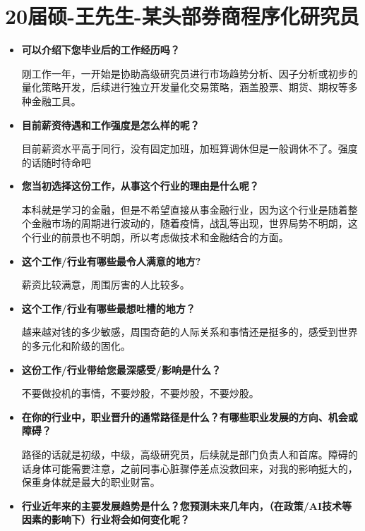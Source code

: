 \newpage
\section{20届硕-王先生-某头部券商程序化研究员}
\begin{itemize}

\setlength{\parindent}{2em} 
    \item \textbf{可以介绍下您毕业后的工作经历吗？}

刚工作一年，一开始是协助高级研究员进行市场趋势分析、因子分析或初步的量化策略开发，后续进行独立开发量化交易策略，涵盖股票、期货、期权等多种金融工具。

    \item \textbf{目前薪资待遇和工作强度是怎么样的呢？}

目前薪资水平高于同行，没有固定加班，加班算调休但是一般调休不了。强度的话随时待命吧


    \item \textbf{您当初选择这份工作，从事这个行业的理由是什么呢？}

本科就是学习的金融，但是不希望直接从事金融行业，因为这个行业是随着整个金融市场的周期进行波动的，随着疫情，战乱等出现，世界局势不明朗，这个行业的前景也不明朗，所以考虑做技术和金融结合的方面。

  
    \item \textbf{这个工作/行业有哪些最令人满意的地方?}

薪资比较满意，周围厉害的人比较多。


    \item \textbf{这个工作/行业有哪些最想吐槽的地方？}

越来越对钱的多少敏感，周围奇葩的人际关系和事情还是挺多的，感受到世界的多元化和阶级的固化。

    \item \textbf{这份工作/行业带给您最深感受/影响是什么？}

不要做投机的事情，不要炒股，不要炒股，不要炒股。

    \item \textbf{在你的行业中，职业晋升的通常路径是什么？有哪些职业发展的方向、机会或障碍？}

路径的话就是初级，中级，高级研究员，后续就是部门负责人和首席。障碍的话身体可能需要注意，之前同事心脏骤停差点没救回来，对我的影响挺大的，保重身体就是最大的职业财富。

    \item \textbf{行业近年来的主要发展趋势是什么？您预测未来几年内，（在政策/AI技术等因素的影响下）行业将会如何变化呢？}


\end{itemize}
